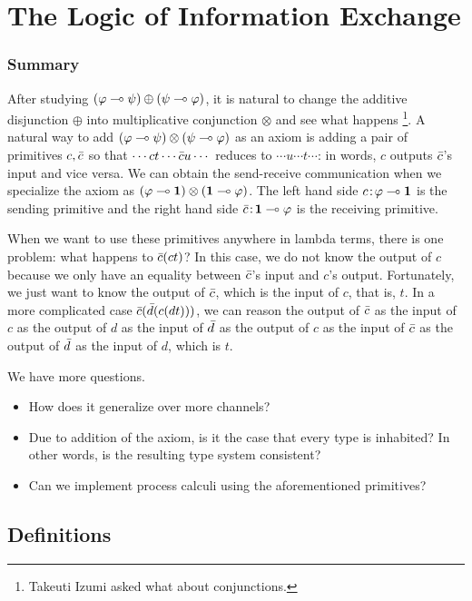 \chapter{The Logic of Information Exchange}
\label{ch:exchange}

\subsection{Summary}

After studying $(\varphi\multimap\psi)\oplus (\psi\multimap\varphi)$,
it is natural to change the additive disjunction $\oplus$ into
multiplicative conjunction $\otimes$ and see what happens%
\footnote{Takeuti Izumi asked what about conjunctions.}.
A natural way to add $(\varphi\multimap\psi)\otimes(\psi\multimap\varphi)$ as an axiom
is adding a pair of primitives $c,\bar{c}$ so that
$\cdots ct \cdots \bar{c} u \cdots$ reduces to
$\cdots u  \cdots t \cdots$: in words,
$c$ outputs $\bar{c}$'s input and vice versa.
We can obtain the send-receive communication when we specialize the
axiom as $(\varphi\multimap \mathbf{1})\otimes(\mathbf{1}\multimap\varphi)$.  The left hand side
${c} \mathord{\colon\kern -2pt}{\varphi\multimap\mathbf{1}}$ is the sending primitive and
the right hand side ${\bar{c}} \mathord{\colon\kern -2pt}{\mathbf{1} \multimap\varphi}$ is the receiving
primitive.

When we want to use these primitives anywhere in lambda terms,
there is one problem: what happens to $\bar{c}(c t)$?
In this case, we do not know the output of $c$ because we only have an
equality between $\bar{c}$'s input and $c$'s output.
Fortunately, we just want to know the output of $\bar{c}$, which is the
input of $c$, that is, $t$.
In a more complicated case $\bar{c}(\bar{d}(c (d t)))$,
we can reason the output of $\bar{c}$ as the input of $c$ as the output of
$d$ as the input of $\bar{d}$ as the output of $c$ as the input of $\bar{c}$
as the output of $\bar{d}$ as the input of $d$, which is $t$.

We have more questions.
\begin{itemize}
 \item How does it generalize over more channels?
 \item Due to addition of the axiom, is it the case that
       every type is inhabited?  In other words,
      is the resulting type system consistent?
 \item Can we implement process calculi using the aforementioned primitives?
\end{itemize}

\section{Definitions}

